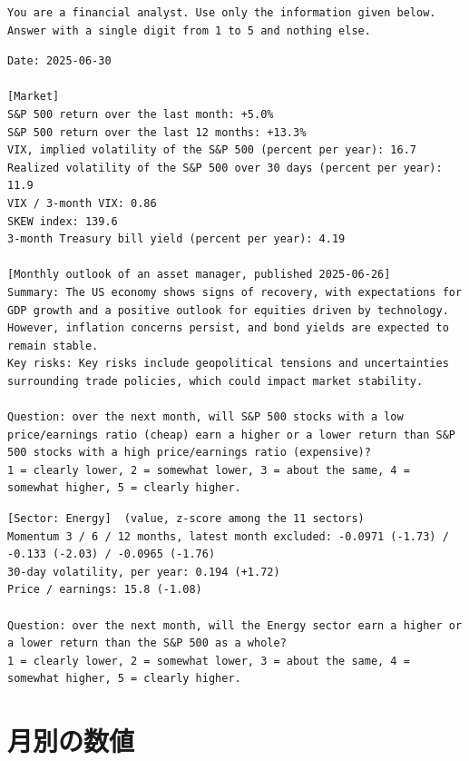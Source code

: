 \documentclass[xelatex,ja=standard,jafont=hiragino-pron,a4paper,10pt]{bxjsreport}
\begin{document}
\begin{lstlisting}[caption={実験 G のシステムプロンプト}]
You are a financial analyst. Use only the information given below. Answer with a single digit from 1 to 5 and nothing else.
\end{lstlisting}
\begin{lstlisting}[caption={実験 G のユーザープロンプト（割安さ、判断日 2025-06-30）}]
Date: 2025-06-30

[Market]
S&P 500 return over the last month: +5.0%
S&P 500 return over the last 12 months: +13.3%
VIX, implied volatility of the S&P 500 (percent per year): 16.7
Realized volatility of the S&P 500 over 30 days (percent per year): 11.9
VIX / 3-month VIX: 0.86
SKEW index: 139.6
3-month Treasury bill yield (percent per year): 4.19

[Monthly outlook of an asset manager, published 2025-06-26]
Summary: The US economy shows signs of recovery, with expectations for GDP growth and a positive outlook for equities driven by technology. However, inflation concerns persist, and bond yields are expected to remain stable.
Key risks: Key risks include geopolitical tensions and uncertainties surrounding trade policies, which could impact market stability.

Question: over the next month, will S&P 500 stocks with a low price/earnings ratio (cheap) earn a higher or a lower return than S&P 500 stocks with a high price/earnings ratio (expensive)?
1 = clearly lower, 2 = somewhat lower, 3 = about the same, 4 = somewhat higher, 5 = clearly higher.
\end{lstlisting}
\begin{lstlisting}[caption={セクターの問いで足される部分（Energy）}]
[Sector: Energy]  (value, z-score among the 11 sectors)
Momentum 3 / 6 / 12 months, latest month excluded: -0.0971 (-1.73) / -0.133 (-2.03) / -0.0965 (-1.76)
30-day volatility, per year: 0.194 (+1.72)
Price / earnings: 15.8 (-1.08)

Question: over the next month, will the Energy sector earn a higher or a lower return than the S&P 500 as a whole?
1 = clearly lower, 2 = somewhat lower, 3 = about the same, 4 = somewhat higher, 5 = clearly higher.
\end{lstlisting}

\chapter{月別の数値}\label{app:monthly}
\end{document}
